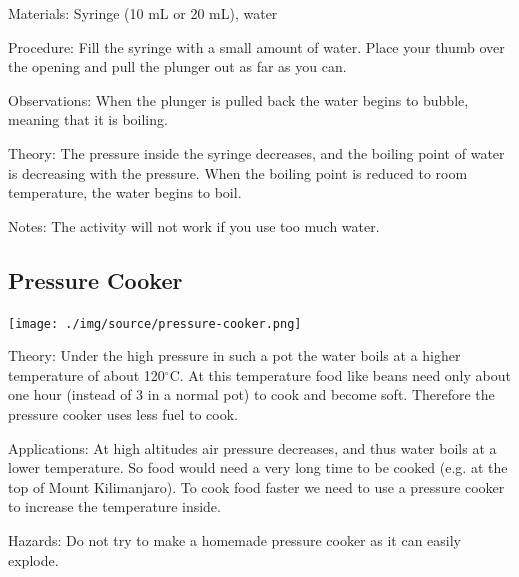 \begin{multicols}{2}
\begin{description*}
\item[Materials:]{Syringe (10 mL or 20 mL), water}
\item[Procedure:]{Fill the syringe with a small amount of water. Place your thumb over the opening and pull the plunger out as far as you can.}
\item[Observations:]{When the plunger is pulled back the water begins to bubble, meaning that it is boiling.}
\item[Theory:]{The pressure inside the syringe decreases, and the boiling point of water is decreasing with the pressure. When the boiling point is reduced to room temperature, the water begins to boil.}
\item[Notes:]{The activity will not work if you use too much water.}
\end{description*}

\subsection{Pressure Cooker}

\begin{center}
\texttt{[image: ./img/source/pressure-cooker.png]}
\end{center}

\begin{description*}
\item[Theory:]{Under the high pressure in such a pot the water boils at a higher temperature of about 120$^\circ$C. At this temperature food like beans need only about one hour (instead of 3 in a normal pot) to cook and become soft. Therefore the pressure cooker uses less fuel to cook.}
\item[Applications:]{At high altitudes air pressure decreases, and thus water boils at a lower temperature. So food would need a very long time to be cooked (e.g. at the top of Mount Kilimanjaro). To cook food faster we need to use a pressure cooker to increase the temperature inside.}
\item[Hazards:]{Do not try to make a homemade pressure cooker as it can easily explode.}
\end{description*}


\end{multicols}

